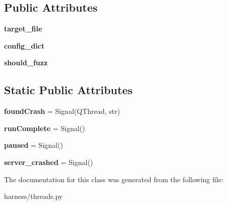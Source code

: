 \subsection*{Public Attributes}
\begin{DoxyCompactItemize}
\item 
\mbox{\label{classharness_1_1threads_1_1_fuzzer_thread_aff65c5664d1757e1a85e147612ee35ff}} 
{\bfseries target\+\_\+file}
\item 
\mbox{\label{classharness_1_1threads_1_1_fuzzer_thread_a4bea4a5e6764011098efc0832d885c71}} 
{\bfseries config\+\_\+dict}
\item 
\mbox{\label{classharness_1_1threads_1_1_fuzzer_thread_a2aedb3000886571450f80b2352bfd219}} 
{\bfseries should\+\_\+fuzz}
\end{DoxyCompactItemize}
\subsection*{Static Public Attributes}
\begin{DoxyCompactItemize}
\item 
\mbox{\label{classharness_1_1threads_1_1_fuzzer_thread_aadab996eef29ed6707d6db917705fc83}} 
{\bfseries found\+Crash} = Signal(Q\+Thread, str)
\item 
\mbox{\label{classharness_1_1threads_1_1_fuzzer_thread_a1ce6ed7621651d0a253a96b07de14a64}} 
{\bfseries run\+Complete} = Signal()
\item 
\mbox{\label{classharness_1_1threads_1_1_fuzzer_thread_a5594a05d1f16914031f79881721828fd}} 
{\bfseries paused} = Signal()
\item 
\mbox{\label{classharness_1_1threads_1_1_fuzzer_thread_a99f2f6d17a51e18aa7d371920f20ae3d}} 
{\bfseries server\+\_\+crashed} = Signal()
\end{DoxyCompactItemize}


The documentation for this class was generated from the following file\+:\begin{DoxyCompactItemize}
\item 
harness/threads.\+py\end{DoxyCompactItemize}
